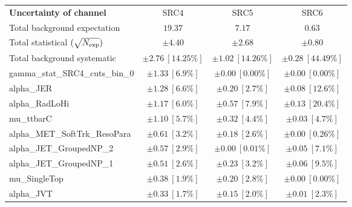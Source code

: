 
\begin{table}
\begin{center}
\setlength{\tabcolsep}{0.0pc}
\begin{tabular*}{\textwidth}{@{\extracolsep{\fill}}lccc}
\noalign{\smallskip}\hline\noalign{\smallskip}
{\bf Uncertainty of channel}                                    & SRC4            & SRC5            & SRC6            \\
\noalign{\smallskip}\hline\noalign{\smallskip}
Total background expectation             &  $19.37$        &  $7.17$        &  $0.63$       \\
\noalign{\smallskip}\hline\noalign{\smallskip}
Total statistical $(\sqrt{N_{\rm exp}})$              & $\pm 4.40$        & $\pm 2.68$        & $\pm 0.80$       \\
Total background systematic               & $\pm 2.76\ [14.25\%] $        & $\pm 1.02\ [14.26\%] $        & $\pm 0.28\ [44.49\%] $             \\
\noalign{\smallskip}\hline\noalign{\smallskip}
\noalign{\smallskip}\hline\noalign{\smallskip}
gamma\_stat\_SRC4\_cuts\_bin\_0         & $\pm 1.33\ [6.9\%] $          & $\pm 0.00\ [0.00\%] $          & $\pm 0.00\ [0.00\%] $       \\
alpha\_JER         & $\pm 1.28\ [6.6\%] $          & $\pm 0.20\ [2.7\%] $          & $\pm 0.08\ [12.6\%] $       \\
alpha\_RadLoHi         & $\pm 1.17\ [6.0\%] $          & $\pm 0.57\ [7.9\%] $          & $\pm 0.13\ [20.4\%] $       \\
mu\_ttbarC         & $\pm 1.10\ [5.7\%] $          & $\pm 0.32\ [4.4\%] $          & $\pm 0.03\ [4.7\%] $       \\
alpha\_MET\_SoftTrk\_ResoPara         & $\pm 0.61\ [3.2\%] $          & $\pm 0.18\ [2.6\%] $          & $\pm 0.00\ [0.26\%] $       \\
alpha\_JET\_GroupedNP\_2         & $\pm 0.57\ [2.9\%] $          & $\pm 0.00\ [0.01\%] $          & $\pm 0.05\ [7.1\%] $       \\
alpha\_JET\_GroupedNP\_1         & $\pm 0.51\ [2.6\%] $          & $\pm 0.23\ [3.2\%] $          & $\pm 0.06\ [9.5\%] $       \\
mu\_SingleTop         & $\pm 0.38\ [1.9\%] $          & $\pm 0.20\ [2.8\%] $          & $\pm 0.00\ [0.00\%] $       \\
alpha\_JVT         & $\pm 0.33\ [1.7\%] $          & $\pm 0.15\ [2.0\%] $          & $\pm 0.01\ [2.3\%] $       \\

\end{tabular*}
\end{center}
\end{table}
